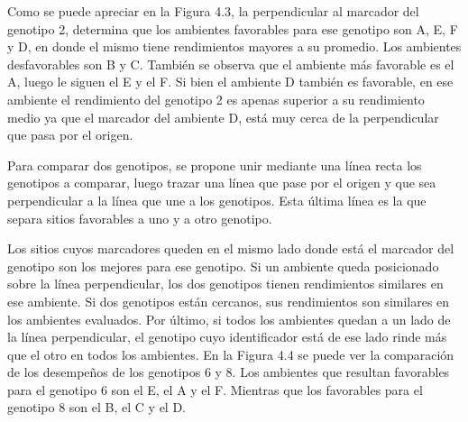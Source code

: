 Como se puede apreciar en la Figura 4.3, la perpendicular al marcador del genotipo 2, determina que los ambientes favorables para ese genotipo son A, E, F y D, en donde el mismo tiene rendimientos mayores a su promedio. Los ambientes desfavorables son B y C.
También se observa que el ambiente más favorable es el A, luego le siguen el E y el F. Si bien el ambiente D también es favorable, en ese ambiente el rendimiento del genotipo 2 es apenas superior a su rendimiento medio ya que el marcador del ambiente D, está muy cerca de la perpendicular que pasa por el origen.


Para comparar dos genotipos, se propone unir mediante una línea recta los genotipos a comparar, luego trazar una línea que pase por el origen y que sea perpendicular a la línea que une a los genotipos. Esta última línea es la que separa sitios favorables a uno y a otro genotipo.


Los sitios cuyos marcadores queden en el mismo lado donde está el marcador del genotipo son los mejores para ese genotipo. Si un ambiente queda posicionado sobre la línea perpendicular, los dos genotipos tienen rendimientos similares en ese ambiente. Si dos genotipos están cercanos, sus rendimientos son similares en los ambientes evaluados. Por último, si todos los ambientes quedan a un lado de la línea perpendicular, el genotipo cuyo identificador está de ese lado rinde más que el otro en todos los ambientes.
En la Figura 4.4 se puede ver la comparación de los desempeños de los genotipos 6 y 8. Los ambientes que resultan favorables para el genotipo 6 son el E, el A y el F. Mientras que los favorables para el genotipo 8 son el B, el C y el D.



